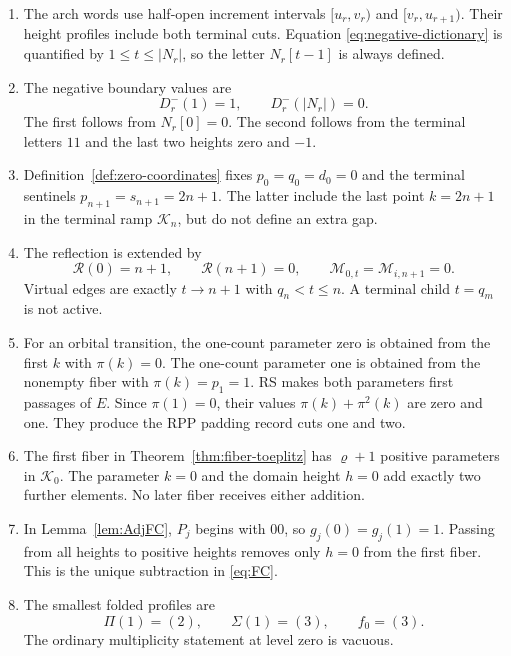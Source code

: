 \documentclass[11pt]{article}
\theoremstyle{definition}
\theoremstyle{remark}
\begin{document}
\begin{enumerate}[label=\textup{(\roman*)}]
\item The arch words use half-open increment intervals
\([u_r,v_r)\) and \([v_r,u_{r+1})\).  Their height profiles include both
terminal cuts.  Equation \eqref{eq:negative-dictionary} is quantified by
\(1\leq t\leq|N_r|\), so the letter \(N_r[t-1]\) is always defined.

\item The negative boundary values are
\[
 D_r^-(1)=1,
 \qquad D_r^-(|N_r|)=0.
\]
The first follows from \(N_r[0]=0\).  The second follows from the terminal
letters \(11\) and the last two heights zero and \(-1\).

\item Definition~\ref{def:zero-coordinates} fixes
\(p_0=q_0=d_0=0\) and the terminal sentinels
\(p_{n+1}=s_{n+1}=2n+1\).  The latter include the last point
\(k=2n+1\) in the terminal ramp \(\mathcal K_n\), but do not define an extra
gap.

\item The reflection is extended by
\[
 \mathcal R(0)=n+1,
 \qquad \mathcal R(n+1)=0,
 \qquad \mathcal M_{0,t}=\mathcal M_{i,n+1}=0.
\]
Virtual edges are exactly \(t\to n+1\) with \(q_n<t\leq n\).  A terminal
child \(t=q_m\) is not active.

\item For an orbital transition, the one-count parameter zero is obtained
from the first \(k\) with \(\pi(k)=0\).  The one-count parameter one is obtained from the
nonempty fiber with \(\pi(k)=p_1=1\).  RS makes both parameters first
passages of \(E\).  Since \(\pi(1)=0\), their values
\(\pi(k)+\pi^2(k)\) are zero and one.  They produce the RPP padding record
cuts one and two.

\item The first fiber in Theorem~\ref{thm:fiber-toeplitz} has
\(\varrho+1\) positive parameters in \(\mathcal K_0\).  The parameter
\(k=0\) and the domain height \(h=0\) add exactly two further elements.
No later fiber receives either addition.

\item In Lemma~\ref{lem:AdjFC}, \(P_j\) begins with \(00\), so
\(g_j(0)=g_j(1)=1\).  Passing from all heights to positive heights removes
only \(h=0\) from the first fiber.  This is the unique subtraction in
\eqref{eq:FC}.

\item The smallest folded profiles are
\[
 \Pi(1)=(2),
 \qquad \Sigma(1)=(3),
 \qquad f_0=(3).
\]
The ordinary multiplicity statement at level zero is vacuous.
\end{enumerate}
\end{document}

